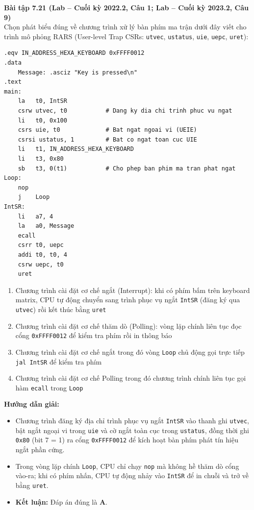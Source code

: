 \textbf{Bài tập 7.21 (Lab -- Cuối kỳ 2022.2, Câu 1; Lab -- Cuối kỳ 2023.2, Câu 9)}\\
Chọn phát biểu đúng về chương trình xử lý bàn phím ma trận dưới đây viết cho trình mô phỏng RARS (User-level Trap CSRs: \texttt{utvec}, \texttt{ustatus}, \texttt{uie}, \texttt{uepc}, \texttt{uret}):
\begin{lstlisting}
.eqv IN_ADDRESS_HEXA_KEYBOARD 0xFFFF0012
.data
    Message: .asciz "Key is pressed\n"
.text
main:
    la   t0, IntSR
    csrw utvec, t0           # Dang ky dia chi trinh phuc vu ngat
    li   t0, 0x100
    csrs uie, t0             # Bat ngat ngoai vi (UEIE)
    csrsi ustatus, 1         # Bat co ngat toan cuc UIE
    li   t1, IN_ADDRESS_HEXA_KEYBOARD
    li   t3, 0x80
    sb   t3, 0(t1)           # Cho phep ban phim ma tran phat ngat
Loop:
    nop
    j    Loop
IntSR:
    li   a7, 4
    la   a0, Message
    ecall
    csrr t0, uepc
    addi t0, t0, 4
    csrw uepc, t0
    uret
\end{lstlisting}
\begin{enumerate}[label=\Alph*.]
    \item Chương trình cài đặt cơ chế ngắt (Interrupt): khi có phím bấm trên keyboard matrix, CPU tự động chuyển sang trình phục vụ ngắt \texttt{IntSR} (đăng ký qua \texttt{utvec}) rồi kết thúc bằng \texttt{uret}
    \item Chương trình cài đặt cơ chế thăm dò (Polling): vòng lặp chính liên tục đọc cổng \texttt{0xFFFF0012} để kiểm tra phím rồi in thông báo
    \item Chương trình cài đặt cơ chế ngắt trong đó vòng \texttt{Loop} chủ động gọi trực tiếp \texttt{jal IntSR} để kiểm tra phím
    \item Chương trình cài đặt cơ chế Polling trong đó chương trình chính liên tục gọi hàm \texttt{ecall} trong \texttt{Loop}
\end{enumerate}
\textbf{Hướng dẫn giải:}
\begin{itemize}
    \item Chương trình đăng ký địa chỉ trình phục vụ ngắt \texttt{IntSR} vào thanh ghi \texttt{utvec}, bật ngắt ngoại vi trong \texttt{uie} và cờ ngắt toàn cục trong \texttt{ustatus}, đồng thời ghi \texttt{0x80} (bit 7 = 1) ra cổng \texttt{0xFFFF0012} để kích hoạt bàn phím phát tín hiệu ngắt phần cứng.
    \item Trong vòng lặp chính \texttt{Loop}, CPU chỉ chạy \texttt{nop} mà không hề thăm dò cổng vào-ra; khi có phím nhấn, CPU tự động nhảy vào \texttt{IntSR} để in chuỗi và trở về bằng \texttt{uret}.
    \item \textbf{Kết luận:} Đáp án đúng là \textbf{A}.
\end{itemize}

